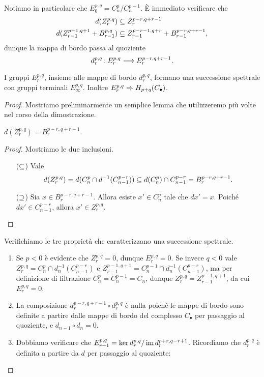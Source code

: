 Notiamo in particolare che \(E^{p,q}_0=C^p_n/C^{p-1}_n\). È immediato verificare che
\begin{align*}
d(Z^{p,q}_r)&\subseteq Z^{p-r,q+r-1}_r\\
d(Z^{p-1,q+1}_{r-1}+B^{p,q}_{r-1})&\subseteq Z^{p-r-1,q+r}_{r-1}+B^{p-r,q+r-1}_{r-1},
\end{align*}
dunque la mappa di bordo passa al quoziente
\[
\map{d^{p,q}_r}{E^{p,q}_r}{E^{p-r,q+r-1}_r}.
\]
\begin{proposition}
I gruppi \(E^{p,q}_r\), insieme alle mappe di bordo \(d^{p,q}_r\), formano una successione spettrale con gruppi terminali \(E^{p,q}_\infty\). Inoltre \(E^{p,q}_r\Rightarrow H_{p+q}(C_\bullet)\).
\end{proposition}
\begin{proof}
Mostriamo preliminarmente un semplice lemma che utilizzeremo più volte nel corso della dimostrazione.
\begin{lemma*}
\(d(Z^{p,q}_r)=B^{p-r,q+r-1}_r\).
\end{lemma*}
\begin{proof}
Mostriamo le due inclusioni.
\begin{itemize}
\item[(\(\subseteq\))] Vale
\[
d(Z^{p,q}_r)=d(C^p_n\cap d^{-1}(C^{p-r}_{n-1}))\subseteq d(C^p_n)\cap C^{p-r}_{n-1}=B^{p-r,q+r-1}_r.
\]
\item[(\(\supseteq\))] Sia \(x\in B^{p-r,q+r-1}_r\). Allora esiste \(x'\in C^p_n\) tale che \(dx'=x\). Poiché \(dx'\in C^{p-r}_{n-1}\), allora \(x'\in Z^{p,q}_r\).\qedhere
\end{itemize}
\end{proof}
Verifichiamo le tre proprietà che caratterizzano una successione spettrale.
\begin{enumerate}
\item Se \(p<0\) è evidente che \(Z^{p,q}_r=0\), dunque \(E^{p,q}_r=0\). Se invece \(q<0\) vale \(Z^{p,q}_r=C^p_n\cap d_n^{-1}(C^{p-r}_{n-1})\) e \(Z^{p-1,q+1}_{r-1}=C^{p-1}_n\cap d_n^{-1}(C^{p-r}_{n-1})\), ma per definizione di filtrazione \(C^p_n=C^{p-1}_n=C_n\), dunque \(Z^{p,q}_r=Z^{p-1,q+1}_{r-1}\), da cui \(E^{p,q}_r=0\).
\item La composizione \(d^{p-r,q+r-1}_r\circ d^{p,q}_r\) è nulla poiché le mappe di bordo sono definite a partire dalle mappe di bordo del complesso \(C_\bullet\) per passaggio al quoziente, e \(d_{n-1}\circ d_n=0\).
\item Dobbiamo verificare che \(E^{p,q}_{r+1}=\ker d^{p,q}_r/\operatorname{im} d^{p+r,q-r+1}_r\). Ricordiamo che \(d^{p,q}_r\) è definita a partire da \(d\) per passaggio al quoziente:

\end{enumerate}
\end{proof}
